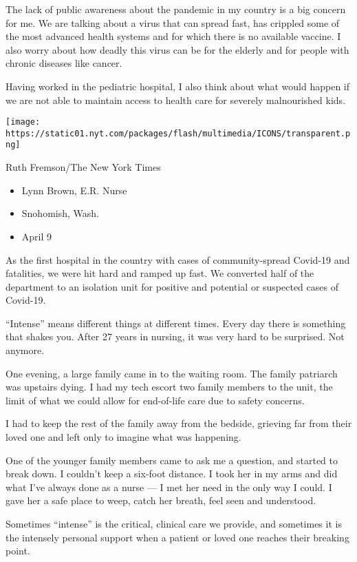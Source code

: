 The lack of public awareness about the pandemic in my country is a big
concern for me. We are talking about a virus that can spread fast, has
crippled some of the most advanced health systems and for which there is
no available vaccine. I also worry about how deadly this virus can be
for the elderly and for people with chronic diseases like cancer.

Having worked in the pediatric hospital, I also think about what would
happen if we are not able to maintain access to health care for severely
malnourished kids.

\texttt{[image: https://static01.nyt.com/packages/flash/multimedia/ICONS/transparent.png]}

Ruth Fremson/The New York Times

\begin{itemize}
\tightlist
\item
  Lynn Brown, E.R. Nurse
\item
  Snohomish, Wash.
\item
  April 9
\end{itemize}

As the first hospital in the country with cases of community-spread
Covid-19 and fatalities, we were hit hard and ramped up fast. We
converted half of the department to an isolation unit for positive and
potential or suspected cases of Covid-19.

``Intense'' means different things at different times. Every day there
is something that shakes you. After 27 years in nursing, it was very
hard to be surprised. Not anymore.

One evening, a large family came in to the waiting room. The family
patriarch was upstairs dying. I had my tech escort two family members to
the unit, the limit of what we could allow for end-of-life care due to
safety concerns.

I had to keep the rest of the family away from the bedside, grieving far
from their loved one and left only to imagine what was happening.

One of the younger family members came to ask me a question, and started
to break down. I couldn't keep a six-foot distance. I took her in my
arms and did what I've always done as a nurse --- I met her need in the
only way I could. I gave her a safe place to weep, catch her breath,
feel seen and understood.

Sometimes ``intense'' is the critical, clinical care we provide, and
sometimes it is the intensely personal support when a patient or loved
one reaches their breaking point.

